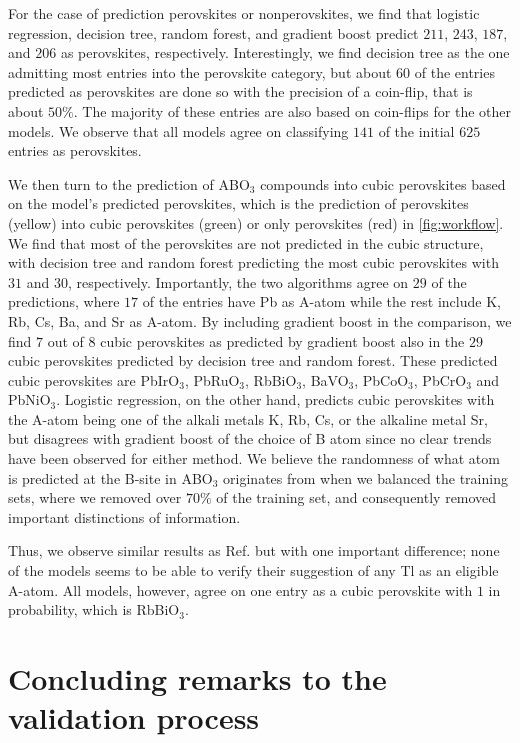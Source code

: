 For the case of prediction perovskites or nonperovskites, we find that logistic regression, decision tree, random forest, and gradient boost predict $211$, $243$, $187$, and $206$ as perovskites, respectively. Interestingly, we find decision tree as the one admitting most entries into the perovskite category, but about $60$ of the entries predicted as perovskites are done so with the precision of a coin-flip, that is about $50\%$. The majority of these entries are also based on coin-flips for the other models. We observe that all models agree on classifying $141$ of the initial $625$ entries as perovskites.

We then turn to the prediction of ABO$_3$ compounds into cubic perovskites based on the model's predicted perovskites, which is the prediction of perovskites (yellow) into cubic perovskites (green) or only perovskites (red) in \autoref{fig:workflow}. We find that most of the perovskites are not predicted in the cubic structure, with decision tree and random forest predicting the most cubic perovskites with $31$ and $30$, respectively. Importantly, the two algorithms agree on $29$ of the predictions, where $17$ of the entries have Pb as A-atom while the rest include K, Rb, Cs, Ba, and Sr as A-atom. By including gradient boost in the comparison, we find $7$ out of $8$ cubic perovskites as predicted by gradient boost also in the $29$ cubic perovskites predicted by decision tree and random forest. These predicted cubic perovskites are PbIrO$_3$, PbRuO$_3$, RbBiO$_3$, BaVO$_3$, PbCoO$_3$, PbCrO$_3$ and PbNiO$_3$. Logistic regression, on the other hand, predicts cubic perovskites with the A-atom being one of the alkali metals K, Rb, Cs, or the alkaline metal Sr, but disagrees with gradient boost of the choice of B atom since no clear trends have been observed for either method. We believe the randomness of what atom is predicted at the B-site in ABO$_3$ originates from when we balanced the training sets, where we removed over $70\%$ of the training set, and consequently removed important distinctions of information.

Thus, we observe similar results as Ref. \cite{Balachandran2018} but with one important difference; none of the models seems to be able to verify their suggestion of any Tl as an eligible A-atom. All models, however, agree on one entry as a cubic perovskite with $1$ in probability, which is RbBiO$_3$.

\section{Concluding remarks to the validation process}

